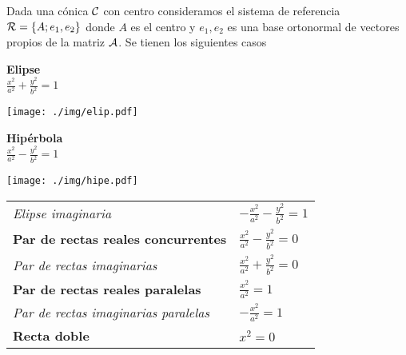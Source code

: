 \vspace{.5cm}

Dada una c\'onica $\cal C$ con centro consideramos el sistema de referencia
${\cal R}=\{A; e_1,e_2\}$ donde $A$
es el centro y $e_1,e_2$ es una base ortonormal de vectores propios de la matriz $\cal A$. Se tienen los siguientes casos

\begin{minipage}[c]{0.45\textwidth}
  {\bf Elipse}\vspace{1em}\\
  $\displaystyle \frac{{x}^2}{a^2} + \frac{{y}^2}{b^2} = 1$
\end{minipage}\hfill
\begin{minipage}[]{0.35\textwidth}
\texttt{[image: ./img/elip.pdf]}
\end{minipage}

\begin{minipage}[c]{0.45\textwidth}
  {\bf Hipérbola}\vspace{1em}\\
  $\displaystyle \frac{{x}^2}{a^2} - \frac{{y}^2}{b^2} = 1$
\end{minipage}\hfill
\begin{minipage}[]{0.35\textwidth}
\texttt{[image: ./img/hipe.pdf]}
\end{minipage}



\vspace{.8cm}

\begin{tabular}{ll}
{\it Elipse imaginaria}  &
$
-\frac{{x}^2}{a^2} - \frac{{y}^2}{b^2} = 1
$
\vspace{.4cm}
\\

{\bf  Par de rectas reales concurrentes}  &
$
\frac{{x}^2}{a^2} - \frac{{y}^2}{b^2}=0
$
\vspace{.4cm}
\\
{\it Par de rectas imaginarias} &
$
\frac{{x}^2}{a^2} + \frac{{y}^2}{b^2}=0
$
\vspace{.4cm}
\\
{\bf  Par de rectas reales paralelas}  &
$
\frac{{x}^2}{a^2}=1
$
\vspace{.4cm}
\\
{\it Par de rectas imaginarias paralelas}  &
$
-\frac{{x}^2}{a^2} = 1
$
\vspace{.4cm}
\\
{\bf  Recta doble}  &
$
{{x}^2} = 0
$
\vspace{.3cm}
\\
\end{tabular}
